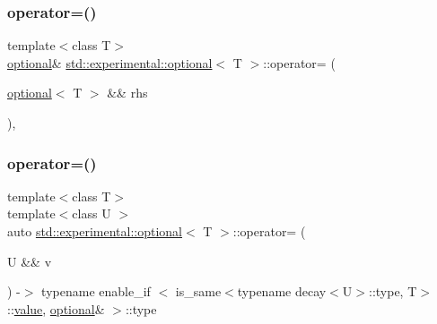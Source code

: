 \subsubsection{\texorpdfstring{operator=()}{operator=()}\hspace{0.1cm}{\footnotesize\ttfamily [3/4]}}
{\footnotesize\ttfamily template$<$class T$>$ \\
\mbox{\hyperlink{classstd_1_1experimental_1_1optional}{optional}}\& \mbox{\hyperlink{classstd_1_1experimental_1_1optional}{std\+::experimental\+::optional}}$<$ T $>$\+::operator= (\begin{DoxyParamCaption}\item[{\mbox{\hyperlink{classstd_1_1experimental_1_1optional}{optional}}$<$ T $>$ \&\&}]{rhs }\end{DoxyParamCaption})\hspace{0.3cm}{\ttfamily [inline]}, {\ttfamily [noexcept]}}

\mbox{\label{classstd_1_1experimental_1_1optional_a7234fc6703bf072bef7abd51ae6ea81f}} 
\subsubsection{\texorpdfstring{operator=()}{operator=()}\hspace{0.1cm}{\footnotesize\ttfamily [4/4]}}
{\footnotesize\ttfamily template$<$class T$>$ \\
template$<$class U $>$ \\
auto \mbox{\hyperlink{classstd_1_1experimental_1_1optional}{std\+::experimental\+::optional}}$<$ T $>$\+::operator= (\begin{DoxyParamCaption}\item[{U \&\&}]{v }\end{DoxyParamCaption}) -\/$>$ typename enable\+\_\+if
                $<$
                    is\+\_\+same$<$typename decay$<$U$>$\+::type, T$>$\+::\mbox{\hyperlink{classstd_1_1experimental_1_1optional_ad1277f09c288255dfe102b72e7107be6}{value}},
                    \mbox{\hyperlink{classstd_1_1experimental_1_1optional}{optional}}\&
                $>$\+::type
            \hspace{0.3cm}{\ttfamily [inline]}}

\mbox{\label{classstd_1_1experimental_1_1optional_a6ce77ba1776c86de36a5ae1d16dfd80f}} 
